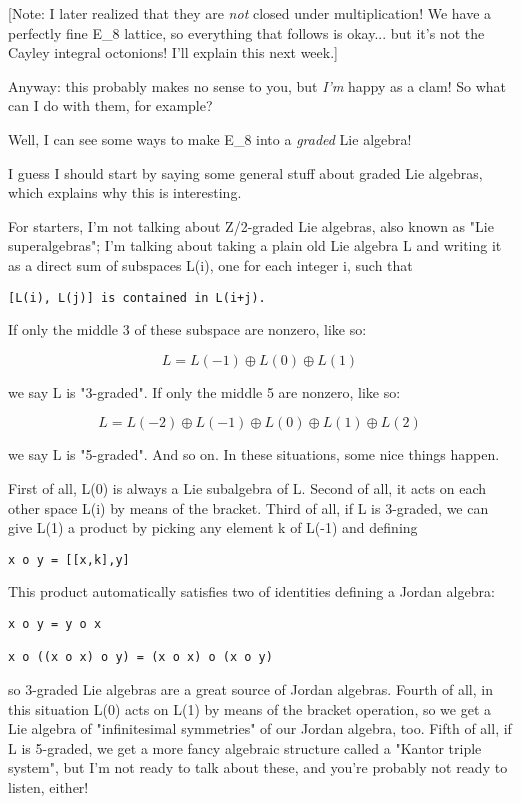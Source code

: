[Note: I later realized that they are \emph{not} closed under 
multiplication!  We have a perfectly fine E_{8} lattice, so
everything that follows is okay... but it's not the Cayley integral 
octonions!  I'll explain this next week.]

Anyway: this probably makes no sense to you, but \emph{I'm} happy as a clam!
So what can I do with them, for example?

Well, I can see some ways to make E_{8} into a \emph{graded} Lie algebra!

I guess I should start by saying some general stuff about graded Lie
algebras, which explains why this is interesting.


For starters, I'm not talking about Z/2-graded Lie algebras, also known
as "Lie superalgebras"; I'm talking about taking a plain old
Lie algebra L and writing it as a direct sum of subspaces L(i), one for
each integer i, such that

\begin{verbatim}
[L(i), L(j)] is contained in L(i+j).
\end{verbatim}
    
If only the middle 3 of these subspace are nonzero, like so:

$$
L = L(-1) \oplus  L(0) \oplus  L(1)
$$
    
we say L is "3-graded". If only the middle 5 are nonzero, like so:

$$
L = L(-2) \oplus  L(-1) \oplus  L(0) \oplus  L(1) \oplus  L(2)
$$
    

we say L is "5-graded".  And so on.  In these situations,
some nice things happen.

First of all, L(0) is always a Lie subalgebra of L.  Second of all, 
it acts on each other space L(i) by means of the bracket.  Third of all,
if L is 3-graded, we can give L(1) a product by picking any element k of
L(-1) and defining

\begin{verbatim}
x o y = [[x,k],y]
\end{verbatim}
    
This product automatically satisfies two of identities defining
a Jordan algebra: 

\begin{verbatim}
x o y = y o x

x o ((x o x) o y) = (x o x) o (x o y)
\end{verbatim}
    
so 3-graded Lie algebras are a great source of Jordan algebras.  Fourth
of all, in this situation L(0) acts on L(1) by means of the bracket
operation, so we get a Lie algebra of "infinitesimal
symmetries" of our Jordan algebra, too.  Fifth of all, if L is
5-graded, we get a more fancy algebraic structure called a "Kantor
triple system", but I'm not ready to talk about these, and you're
probably not ready to listen, either!

